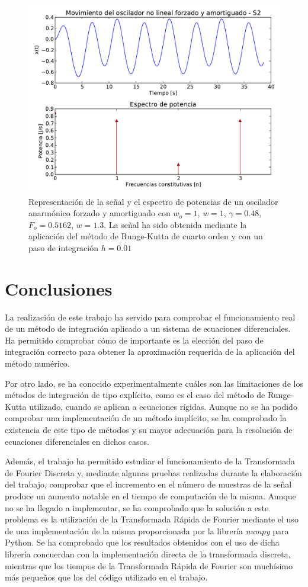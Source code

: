 \documentclass[11pt]{article}
\begin{document}
\begin{figure}
\centering
\includegraphics[width=0.75\linewidth]{caso_anarmonico_s2.pdf}
\caption{Representación de la señal y el espectro de potencias de un oscilador
anarmónico forzado y amortiguado con $w_o = 1$, $w = 1$, $\gamma = 0.48$,
$F_o = 0.5162$, $w = 1.3$. La señal ha sido obtenida mediante la aplicación del
método de Runge-Kutta de cuarto orden y con un paso de integración $h = 0.01$}
\label{fig:caso_anarmonico_s2}
\end{figure}

\section{Conclusiones}
La realización de este trabajo ha servido para comprobar el funcionamiento real
de un método de integración aplicado a un sistema de ecuaciones diferenciales.
Ha permitido comprobar cómo de importante es la elección del paso de integración
correcto para obtener la aproximación requerida de la aplicación del método
numérico.

Por otro lado, se ha conocido experimentalmente cuáles son las limitaciones de
los métodos de integración de tipo explícito, como es el caso del método de
Runge-Kutta utilizado, cuando se aplican a ecuaciones rígidas. Aunque no se ha
podido comprobar una implementación de un método implícito, se ha comprobado la
existencia de este tipo de métodos y su mayor adecuación para la resolución de
ecuaciones diferenciales en dichos casos.

Además, el trabajo ha permitido estudiar el funcionamiento de la Transformada de
Fourier Discreta y, mediante algunas pruebas realizadas durante la elaboración
del trabajo, comprobar que el incremento en el número de muestras de la señal
produce un aumento notable en el tiempo de computación de la misma. Aunque no se
ha llegado a implementar, se ha comprobado que la solución a este problema es la
utilización de la Transformada Rápida de Fourier mediante el uso de una
implementación de la misma proporcionada por la librería \textit{numpy} para
Python. Se ha comprobado que los resultados obtenidos con el uso de dicha
librería concuerdan con la implementación directa de la transformada discreta,
mientras que los tiempos de la Transformada Rápida de Fourier son muchísimo más
pequeños que los del código utilizado en el trabajo.
\end{document}
